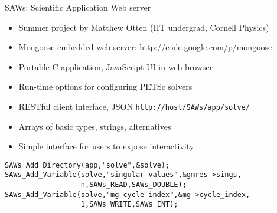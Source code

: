 \documentclass[final,t]{beamer}
\begin{document}
\begin{frame}[fragile]{}
\begin{columns}
\begin{column}{0.49\textwidth}
      \vspace{-2em}
      \begin{block}{SAWs: Scientific Application Web server}
        \begin{itemize}
        \item Summer project by Matthew Otten (IIT undergrad, Cornell Physics)
        \item Mongoose embedded web server: \url{http://code.google.com/p/mongoose}
        \item Portable C application, JavaScript UI in web browser
        \item Run-time options for configuring PETSc solvers
        \item RESTful client interface, JSON
          \texttt{http://host/SAWs/app/solve/}
        \item Arrays of basic types, strings, alternatives
        \item Simple interface for users to expose interactivity
        \end{itemize}
\begin{verbatim}
SAWs_Add_Directory(app,"solve",&solve);
SAWs_Add_Variable(solve,"singular-values",&gmres->sings,
                  n,SAWs_READ,SAWs_DOUBLE);
SAWs_Add_Variable(solve,"mg-cycle-index",&mg->cycle_index,
                  1,SAWs_WRITE,SAWs_INT);
\end{verbatim}
      \end{block}
    \end{column}


\end{columns}
\end{frame}
\end{document}
